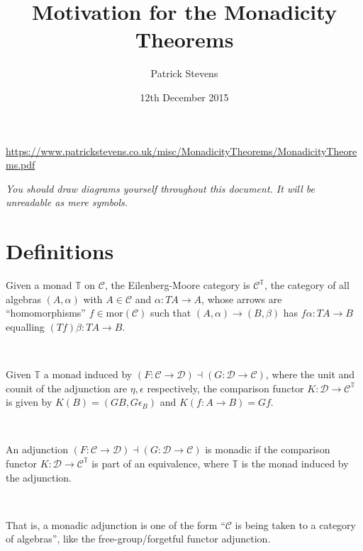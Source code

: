 \documentclass[11pt]{amsart}
\title{Motivation for the Monadicity Theorems}
\author{Patrick Stevens}
\date{12th December 2015}
\begin{document}
\maketitle

\tiny \begin{center} \url{https://www.patrickstevens.co.uk/misc/MonadicityTheorems/MonadicityTheorems.pdf} \end{center}

\normalsize

\emph{You should draw diagrams yourself throughout this document. It will be unreadable as mere symbols.}

\section{Definitions}

\begin{defn}
Given a monad $\mathbb{T}$ on $\mathcal{C}$, the Eilenberg-Moore category is $\mathcal{C}^{\mathbb{T}}$, the category of all algebras $(A, \alpha)$ with $A \in \mathcal{C}$ and $\alpha: TA \to A$, whose arrows are ``homomorphisms'' $f \in \text{mor}(\mathcal{C})$ such that $(A, \alpha) \to (B, \beta)$ has $f \alpha: TA \to B$ equalling $(Tf) \beta : TA \to B$.
\end{defn}

\

\begin{defn} Given $\mathbb{T}$ a monad induced by $(F: \mathcal{C} \to \mathcal{D}) \dashv (G: \mathcal{D} \to \mathcal{C})$, where the unit and counit of the adjunction are $\eta, \epsilon$ respectively, the comparison functor $K: \mathcal{D} \to \mathcal{C}^{\mathbb{T}}$ is given by $K(B) = (GB, G \epsilon_B)$ and $K(f: A \to B) = Gf$.
\end{defn}

\

\begin{defn}An adjunction $(F: \mathcal{C} \to \mathcal{D}) \dashv (G: \mathcal{D} \to \mathcal{C})$ is monadic if the comparison functor $K: \mathcal{D} \to \mathcal{C}^{\mathbb{T}}$ is part of an equivalence, where $\mathbb{T}$ is the monad induced by the adjunction.
\end{defn}

\

That is, a monadic adjunction is one of the form ``$\mathcal{C}$ is being taken to a category of algebras'', like the free-group/forgetful functor adjunction.

\
\end{document}
